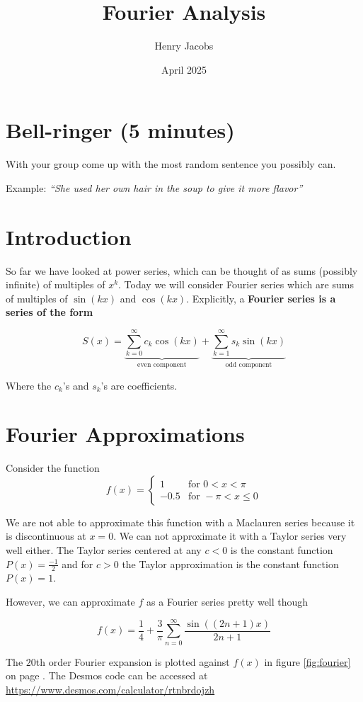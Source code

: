 \documentclass[12pt]{amsart}
\title{Fourier Analysis}
\author{Henry Jacobs}
\date{April 2025}
\begin{document}
\maketitle

\section{Bell-ringer (5 minutes)}
With your group come up with the most random sentence you possibly can.

Example: {\it ``She used her own hair in the soup to give it more flavor''}


\section{Introduction}
So far we have looked at power series, which can be thought of as sums (possibly infinite) of multiples of $x^k$.
Today we will consider Fourier series which are sums of multiples of $\sin(kx)$ and $\cos(kx)$.
Explicitly, a {\bf Fourier series is a series of the form}

$$
S(x) = \underbrace{\sum_{k=0}^{\infty} c_k \cos(kx) }_{\text{even component}}
+ \underbrace{\sum_{k=1}^{\infty} s_k \sin(kx)}_{\text{odd component}}
$$

Where the $c_k$'s and $s_k$'s are coefficients.

\section{Fourier Approximations}
Consider the function 
$$
f(x) = \begin{cases}
    1 & \text{for } 0 < x < \pi \\
    -0.5 & \text{for } -\pi < x \leq 0
\end{cases}
$$

We are not able to approximate this function with a Maclauren series because it is discontinuous at $x=0$.
We can not approximate it with a Taylor series very well either.
The Taylor series centered at any $c < 0$ is the constant function $P(x) = \frac{-1}{2}$ and for $c > 0$ the Taylor approximation is the constant function $P(x)=1$. 

However, we can approximate $f$ as a Fourier series pretty well though

$$
   f(x) = \frac{1}{4} + \frac{3}{\pi} \sum_{n=0}^{\infty} \frac{\sin((2n+1)x)}{2n+1} 
$$

The $20$th order Fourier expansion is plotted against $f(x)$ in figure \ref{fig:fourier} on page \pageref{fig:fourier}.  The Desmos code can be accessed at \url{https://www.desmos.com/calculator/rtnbrdojzh}
\end{document}
